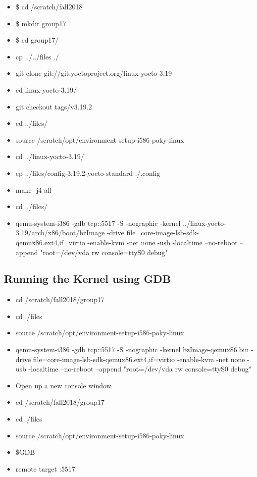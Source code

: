\documentclass{article}
\begin{document}
\begin{itemize}
    \item \$ cd /scratch/fall2018
    \item \$ mkdir group17
    \item \$ cd group17/
    \item cp ../../files ./
    \item git clone git://git.yoctoproject.org/linux-yocto-3.19
\item cd linux-yocto-3.19/
\item git checkout tags/v3.19.2
\item cd ../files/
\item source /scratch/opt/environment-setup-i586-poky-linux
\item cd ../linux-yocto-3.19/
\item cp ../files/config-3.19.2-yocto-standard ./.config
\item make -j4 all
\item cd ../files/
\item qemu-system-i386 -gdb tcp::5517 -S -nographic -kernel ../linux-yocto-3.19/arch/x86/boot/bzImage -drive file=core-image-lsb-sdk-qemux86.ext4,if=virtio -enable-kvm -net none -usb -localtime --no-reboot --append "root=/dev/vda rw console=ttyS0 debug"
\end{itemize}

\subsection{Running the Kernel using GDB}

\begin{itemize}
\item cd /scratch/fall2018/group17
\item cd ./files
\item source /scratch/opt/environment-setup-i586-poky-linux
\item qemu-system-i386 -gdb tcp::5517 -S -nographic -kernel bzImage-qemux86.bin -drive file=core-image-lsb-sdk-qemux86.ext4,if=virtio -enable-kvm -net none -usb -localtime --no-reboot --append "root=/dev/vda rw console=ttyS0 debug"
\item Open up a new console window
\item cd /scratch/fall2018/group17
\item cd ./files
\item source /scratch/opt/environment-setup-i586-poky-linux
\item \$GDB
\item remote target :5517
\end{itemize}
\end{document}
